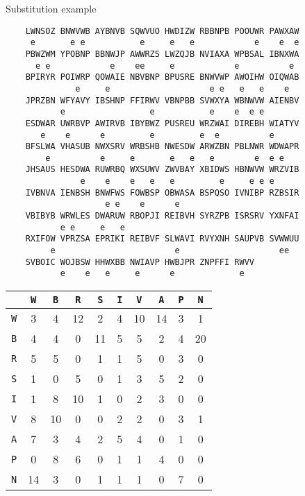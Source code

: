 \documentclass[8pt]{beamer}
\theoremstyle{plain}
\begin{document}
\begin{frame}[fragile]{Substitution example}
\begin{center}
\begin{BVerbatim}
    LWNSOZ BNWVWB AYBNVB SQWVUO HWDIZW RBBNPB POOUWR PAWXAW
     e       e e           e     e   e            e    e  e
    PBWZWM YPOBNP BBNWJP AWWRZS LWZQJB NVIAXA WPBSAL IBNXWA
      e e            e    ee     e            e          e 
    BPIRYR POIWRP QOWAIE NBVBNP BPUSRE BNWVWP AWOIHW OIQWAB
              e     e                    e e   e   e    e  
    JPRZBN WFYAVY IBSHNP FFIRWV VBNPBB SVWXYA WBNWVW AIENBV
           e                 e           e    e  e e       
    ESDWAR UWRBVP AWIRVB IBYBWZ PUSREU WRZWAI DIREBH WIATYV
       e    e      e         e         e  e          e     
    BFSLWA VHASUB NWXSRV WRBSHB NWESDW ARWZBN PBLNWR WDWAPR
        e          e     e       e   e   e        e  e e   
    JHSAUS HESDWA RUWRBQ WXSUWV ZWVBAY XBIDWS HBNWVW WRZVIB
               e    e    e   e   e         e     e e e     
    IVBNVA IENBSH BNWFWS FOWBSP OBWASA BSPQSO IVNIBP RZBSIR
                    e e    e      e                        
    VBIBYB WRWLES DWARUW RBOPJI REIBVH SYRZPB ISRSRV YXNFAI
           e e     e   e                                   
    RXIFOW VPRZSA EPRIKI REIBVF SLWAVI RVYXNH SAUPVB SVWWUU
         e                        e                    ee  
    SVBOIC WOJBSW HHWXBB NWIAVP HWBJPR ZNPFFI RWVV
           e    e   e     e      e             e  
\end{BVerbatim}
\end{center}
\end{frame}

\begin{frame}[fragile]
\begin{center}
\begin{tabular}{c | c c c c c c c c c}
    &\texttt{W} & \texttt{B} & \texttt{R} & \texttt{S} & \texttt{I} & \texttt{V} & \texttt{A} & \texttt{P} & \texttt{N}\\
    \hline
    \texttt{W} & 3 & 4 & 12 & 2 & 4 & 10 & 14 & 3 & 1\\
    \texttt{B} & 4 & 4 & 0 & 11 & 5 & 5 & 2 & 4 & 20\\
    \texttt{R} & 5 & 5 & 0 & 1 & 1 & 5 & 0 & 3 & 0\\
    \texttt{S} & 1 & 0 & 5 & 0 & 1 & 3 & 5 & 2 & 0\\
    \texttt{I} & 1 & 8 & 10 & 1 & 0 & 2 & 3 & 0 & 0\\
    \texttt{V} & 8 & 10 & 0 & 0 & 2 & 2 & 0 & 3 & 1\\
    \texttt{A} & 7 & 3 & 4 & 2 & 5 & 4 & 0 & 1 & 0\\
    \texttt{P} & 0 & 8 & 6 & 0 & 1 & 1 & 4 & 0 & 0\\
    \texttt{N} & 14 & 3 & 0 & 1 & 1 & 1 & 0 & 7 & 0\\
\end{tabular}
\end{center}
\end{frame}
\end{document}
